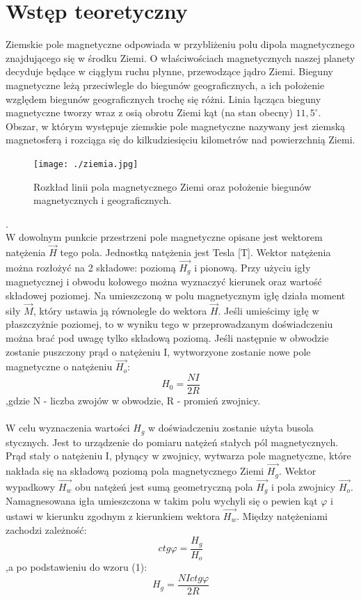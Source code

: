 \documentclass[a4paper,10pt]{article}
\begin{document}
\section{Wstęp teoretyczny}
Ziemskie pole magnetyczne odpowiada w przybliżeniu polu dipola magnetycznego znajdującego się w środku Ziemi. O właściwościach magnetycznych naszej planety decyduje będące w ciągłym ruchu płynne, przewodzące jądro Ziemi. Bieguny magnetyczne leżą przeciwlegle do biegunów geograficznych, a ich położenie względem biegunów geograficznych trochę się różni. Linia łącząca bieguny magnetyczne tworzy wraz z osią obrotu Ziemi kąt (na stan obecny) $11,5^\circ$.  Obszar, w którym występuje ziemskie pole magnetyczne nazywany jest ziemską magnetosferą i rozciąga się do kilkudziesięciu kilometrów nad powierzchnią Ziemi.
\begin{figure}[H]
\centering
  \texttt{[image: ./ziemia.jpg]}
  \caption{Rozkład linii pola magnetycznego Ziemi oraz położenie biegunów magnetycznych i geograficznych.}
  \label{}
\end{figure}.
\\W dowolnym punkcie przestrzeni pole magnetyczne opisane jest wektorem natężenia $\vec{H}$ tego pola. Jednostką natężenia jest Tesla [T]. Wektor natężenia można rozłożyć na 2 składowe: poziomą $\vec{H_g}$ i pionową. Przy użyciu igły magnetycznej i obwodu kołowego można wyznaczyć kierunek oraz wartość składowej poziomej. Na umieszczoną w polu magnetycznym igłę działa moment siły $\vec{M}$, który ustawia ją równolegle do wektora $\vec{H}$. Jeśli umieścimy igłę w płaszczyżnie poziomej, to w wyniku tego w przeprowadzanym doświadczeniu można brać pod uwagę tylko składową poziomą. Jeśli następnie w obwodzie zostanie puszczony prąd o natężeniu I, wytworzyone zostanie nowe pole magnetyczne o natężeniu $\vec{H_o}$:
\begin{equation}
H_0 = \frac{NI}{2R}
\end{equation}
,gdzie N - liczba zwojów w obwodzie, R - promień zwojnicy.
\\
\\W celu wyznaczenia wartości $H_g$ w doświadczeniu zostanie użyta busola stycznych. Jest to urządzenie do pomiaru natężeń stałych pól magnetycznych. Prąd stały o natężeniu I, płynący w zwojnicy, wytwarza pole magnetyczne, które nakłada się na składową poziomą pola magnetycznego Ziemi $\vec{H_g}$. Wektor wypadkowy $\vec{H_w}$ obu natężeń jest sumą geometryczną pola $\vec{H_g}$ i pola zwojnicy $\vec{H_o}$. Namagnesowana igła umieszczona w takim polu wychyli się o pewien kąt $\varphi$ i ustawi w kierunku zgodnym z kierunkiem wektora $\vec{H_w}$. Między natężeniami zachodzi zależność:
\begin{equation}
ctg\varphi = \frac{H_g}{H_o}
\end{equation}
,a po podstawieniu do wzoru (1):
\begin{equation}
H_g = \frac{NIctg\varphi}{2R}
\end{equation}
\end{document}
